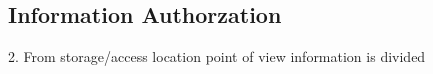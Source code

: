 \documentclass{book}
\begin{document}
\subsection{Information Authorzation}
\label{sub:isis_authorization_information_authorization}

%
%
 2. From storage/access location point of view information is divided
%
%
%
%
%
%
%
%
%
%
\end{document}
